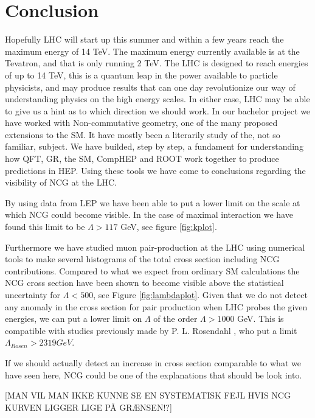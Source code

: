 \section{Conclusion}
Hopefully LHC will start up this summer and within a few years reach the maximum energy of 14 TeV. The maximum energy currently available is at the Tevatron, and that is only running 2 TeV. The LHC is designed to reach energies of up to 14 TeV, this is a quantum leap in the power available to particle physicists, and may produce results that can one day revolutionize our way of understanding physics on the high energy scales. In either case, LHC may be able to give us a hint as to which direction we should work. In our bachelor project we have worked with Non-commutative geometry, one of the many proposed extensions to the SM. It have mostly been a literarily study of the, not so familiar, subject. We have builded, step by step, a fundament for understanding how QFT, GR, the SM, CompHEP and ROOT work together to produce predictions in HEP. Using these tools we have come to conclusions regarding the visibility of NCG at the LHC.

By using data from LEP we have been able to put a lower limit on the scale at which NCG could become visible. In the case of maximal interaction we have found this limit to be $\Lambda > 117$ GeV, see figure \ref{fig:kplot}.

Furthermore we have studied muon pair-production at the LHC using numerical tools to make several histograms of the total cross section including NCG contributions. Compared to what we expect from ordinary SM calculations the NCG cross section have been shown to become visible above the statistical uncertainty for $\Lambda < 500$, see Figure \ref{fig:lambdaplot}. Given that we do not detect any anomaly in the cross section for pair production when LHC probes the given energies, we can put a lower limit on $\Lambda$ of the order $\Lambda > 1000$ GeV. This is compatible with studies previously made by P. L. Rosendahl \cite{rosendahl2008}, who put a limit $\Lambda_{Rosen} > 2319 GeV$.

If we should actually detect an increase in cross section comparable to what we have seen here, NCG could be one of the explanations that should be look into.

[MAN VIL MAN IKKE KUNNE SE EN SYSTEMATISK FEJL HVIS NCG KURVEN LIGGER LIGE PÅ GRÆNSEN!?]


